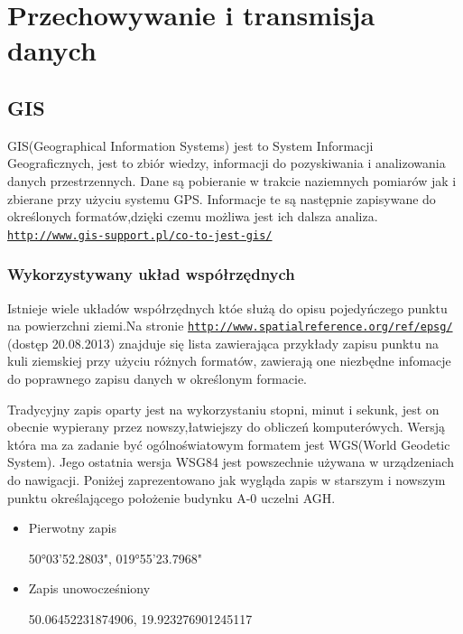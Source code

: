 \section{Przechowywanie i transmisja danych}
\label{sec:przesyl}

\subsection{GIS}
\label{subsec:gis}

GIS(Geographical Information Systems) jest to System Informacji Geograficznych, jest to zbiór wiedzy, informacji do pozyskiwania i analizowania danych przestrzennych. Dane są pobieranie w trakcie naziemnych pomiarów jak i zbierane przy użyciu systemu GPS. Informacje te są następnie zapisywane do określonych formatów,dzięki czemu możliwa jest ich dalsza analiza. \underline{\texttt{http://www.gis-support.pl/co-to-jest-gis/}}

\subsubsection{Wykorzystywany układ współrzędnych}
\label{subsec:uklad}

Istnieje wiele układów współrzędnych któe służą do opisu pojedyńczego punktu na powierzchni ziemi.Na stronie \underline{\texttt{http://www.spatialreference.org/ref/epsg/}} (dostęp 20.08.2013) znajduje się lista zawierająca przykłady zapisu punktu na kuli ziemskiej przy użyciu różnych formatów, zawierają one niezbędne infomacje do poprawnego zapisu danych w określonym formacie.

Tradycyjny zapis oparty jest na wykorzystaniu stopni, minut i sekunk, jest on obecnie wypierany przez nowszy,łatwiejszy do obliczeń komputerówych. Wersją która ma za zadanie być ogólnoświatowym formatem jest WGS(World Geodetic System). Jego ostatnia wersja  WSG84 jest powszechnie używana w urządzeniach do nawigacji. Poniżej zaprezentowano jak wygląda zapis w starszym i nowszym punktu określającego położenie budynku A-0 uczelni AGH.

\begin{itemize}

\item
Pierwotny zapis

50°03'52.2803", 019°55'23.7968"
\item
Zapis unowocześniony

50.06452231874906, 19.923276901245117
\end{itemize}


